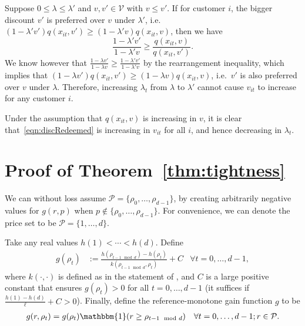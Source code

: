 \documentclass[format=acmsmall, review=false]{acmart}
\newcommand{\bI}{\mathbbm{1}}
\newcommand{\cP}{\mathcal{P}}
\newcommand{\cV}{\mathcal{V}}
\begin{document}
Suppose $0\le\lambda\le\lambda'$ and $v,v'\in\cV$ with $v\le v'$.
If for customer $i$, the bigger discount $v'$ is preferred over $v$ under $\lambda'$, i.e.~$(1-\lambda' v')q(x_{it},v')\ge (1-\lambda' v)q(x_{it},v)$, then we have
$$
\frac{1-\lambda' v'}{1-\lambda' v}\ge\frac{q(x_{it},v)}{q(x_{it},v')}.
$$
We know however that $\frac{1-\lambda v'}{1-\lambda v}\ge\frac{1-\lambda' v'}{1-\lambda' v}$ by the rearrangement inequality, which implies that $(1-\lambda v')q(x_{it},v')\ge (1-\lambda v)q(x_{it},v)$, i.e.~$v'$ is also preferred over $v$ under $\lambda$.  Therefore, increasing $\lambda_t$ from $\lambda$ to $\lambda'$ cannot cause $v_{it}$ to increase for any customer $i$.

Under the assumption that $q(x_{it},v)$ is increasing in $v$, it is clear that~\eqref{eqn:discRedeemed} is increasing in $v_{it}$ for all $i$, and hence decreasing in $\lambda_t$.

\section{Proof of Theorem~\ref{thm:tightness}} \label{pf:tightness}

We can without loss assume $\cP=\{\rho_0,\ldots,\rho_{d-1}\}$, by creating arbitrarily negative values for $g(r,p)$ when $p\notin\{\rho_0,\ldots,\rho_{d-1}\}$.  For convenience, we can denote the price set to be $\cP=\{1,\ldots,d\}$.

Take any real values $h(1)<\cdots<h(d)$.  Define
\begin{align} \label{eqn1}
g(\rho_t) &:=\frac{h(\rho_{t-1\mod d})-h(\rho_t)}{k(\rho_{t-1\mod d},\rho_t)}+C &\forall t=0,\ldots,d-1,
\end{align}
where $k(\cdot,\cdot)$ is defined as in the statement of , and $C$ is a large positive constant that ensures $g(\rho_t)>0$ for all $t=0,\ldots,d-1$ (it suffices if $\frac{h(1)-h(d)}{\ell}+C>0$).
Finally, define the reference-monotone gain function $g$ to be
\begin{align} \label{eqn2}
g(r,\rho_t)
&=g(\rho_t)\bI(r\ge\rho_{t-1\mod d})
&\forall t=0,\ldots,d-1; r\in\cP.
\end{align}
\end{document}
